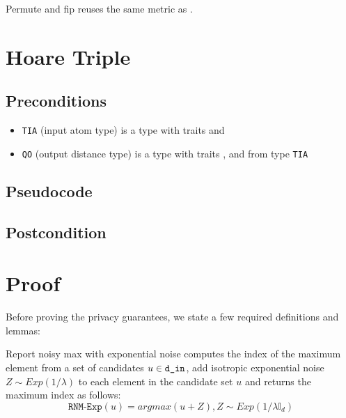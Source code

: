 \documentclass{article} %
\begin{document}
Permute and fip reuses the same metric as .

\section{Hoare Triple}
\subsection*{Preconditions}
\begin{itemize}
    \item \texttt{TIA} (input atom type) is a type with traits  and 
    \item \texttt{QO} (output distance type) is a type with traits , 
     and
     from type \texttt{TIA}
\end{itemize}

\subsection*{Pseudocode}
\label{sec:python-pseudocode}


\subsection*{Postcondition}

\section{Proof}

Before proving the privacy guarantees, we state a few required definitions and lemmas:
\begin{definition}
    \label{definition:rnm-exp}
 Report noisy max with exponential noise computes the index of the maximum element from a set of candidates $u \in \texttt{d\_in} $, add isotropic exponential noise $Z \sim Exp(1/\lambda)$ to each element in the candidate set $u$ and returns the maximum index as follows:
   \begin{equation}
 \texttt{RNM-Exp}(u) = argmax(u + Z), Z \sim Exp(1/\lambda \mathbb{I}_d)
   \end{equation} 
\end{definition}
\end{document}
